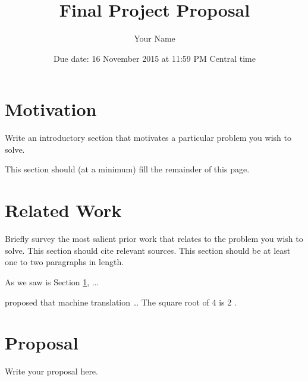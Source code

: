 \documentclass{article}
\title{\bf Final Project Proposal}
\author{Your Name}
\date{Due date: 16 November 2015 at 11:59 PM Central time}
\begin{document}
\maketitle




\section{Motivation}
\label{sec:motivation}

Write an introductory section that motivates a particular problem you wish to solve.

This section should (at a minimum) fill the remainder of this page.



\section{Related Work}

Briefly survey the most salient prior work that relates to the problem you wish to solve. This section should cite relevant sources. This section should be at least one to two paragraphs in length.

As we saw is Section \ref{sec:motivation}, ...
%
%

\citet{Weaver_memo_1949} proposed that machine translation \ldots
%
The square root of 4 is 2 \citep{1952_06_17_BarHillel}.


\section{Proposal}

Write your proposal here.




\end{document}
